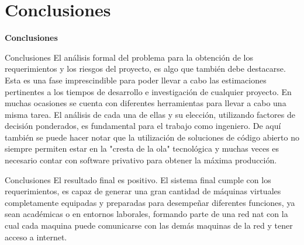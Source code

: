 \documentclass{beamer}
\begin{document}
\section{Conclusiones}
\begin{frame}
    \Huge
    \centering
    \textbf{ Conclusiones }

\end{frame}

\begin{frame}{Conclusiones}
\vspace{-1.5cm}
El análisis formal del problema para la obtención de los requerimientos y los riesgos del proyecto, es algo que también debe destacarse. Esta es una fase imprescindible para poder llevar a cabo las estimaciones pertinentes a los tiempos de desarrollo e investigación de cualquier proyecto. En muchas ocasiones se cuenta con diferentes herramientas para llevar a cabo una misma tarea. El análisis de cada una de ellas y su elección, utilizando factores de decisión ponderados, es fundamental para el trabajo como ingeniero. De aquí también se puede hacer notar que la utilización de soluciones de código abierto no siempre permiten estar en la "cresta de la ola" tecnológica y muchas veces es necesario contar con software privativo para obtener la máxima producción.

\end{frame}


\begin{frame}{Conclusiones}
\vspace{-1.5cm}
El resultado final es positivo. El sistema final cumple con los requerimientos, es capaz de generar una gran cantidad de máquinas virtuales completamente equipadas y preparadas para desempeñar diferentes funciones, ya sean académicas o en entornos laborales, formando parte de una red nat con la cual cada maquina puede comunicarse con las demás maquinas de la red y tener acceso a internet.


\end{frame}
\end{document}
